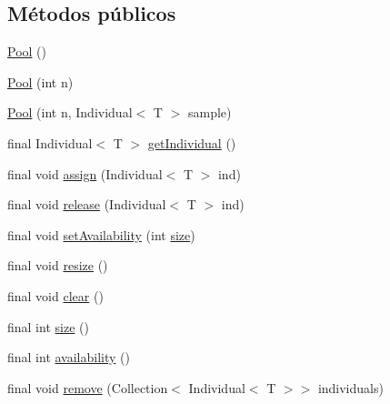\subsection*{Métodos públicos}
\begin{DoxyCompactItemize}
\item 
\hyperlink{classjenes_1_1population_1_1_pool_3_01_t_01extends_01_chromosome_01_4_a4bd84795aaada004e3abac72137269fa}{Pool} ()
\item 
\hyperlink{classjenes_1_1population_1_1_pool_3_01_t_01extends_01_chromosome_01_4_a1f1455e87c094df383563c96e88c4d1b}{Pool} (int n)
\item 
\hyperlink{classjenes_1_1population_1_1_pool_3_01_t_01extends_01_chromosome_01_4_a4326e7c61485eebd85e0ee33ade6ae4a}{Pool} (int n, Individual$<$ T $>$ sample)
\item 
final Individual$<$ T $>$ \hyperlink{classjenes_1_1population_1_1_pool_3_01_t_01extends_01_chromosome_01_4_a56aa9e4c1a8fb6c95c88cbc09f677400}{get\-Individual} ()
\item 
final void \hyperlink{classjenes_1_1population_1_1_pool_3_01_t_01extends_01_chromosome_01_4_aea055f4f71829a56c9d16780d010e861}{assign} (Individual$<$ T $>$ ind)
\item 
final void \hyperlink{classjenes_1_1population_1_1_pool_3_01_t_01extends_01_chromosome_01_4_a5fce371a24676e555aca961e61fb55ae}{release} (Individual$<$ T $>$ ind)
\item 
final void \hyperlink{classjenes_1_1population_1_1_pool_3_01_t_01extends_01_chromosome_01_4_a625297bb7b48e3b6ab11c081874580bf}{set\-Availability} (int \hyperlink{classjenes_1_1population_1_1_pool_3_01_t_01extends_01_chromosome_01_4_a71999d0d1f42f4448c7615cd43bea2f8}{size})
\item 
final void \hyperlink{classjenes_1_1population_1_1_pool_3_01_t_01extends_01_chromosome_01_4_ac9cfd19d4ef83db5f3b1e805458714c2}{resize} ()
\item 
final void \hyperlink{classjenes_1_1population_1_1_pool_3_01_t_01extends_01_chromosome_01_4_a05198e410de8e3d8d12f5598daf079bd}{clear} ()
\item 
final int \hyperlink{classjenes_1_1population_1_1_pool_3_01_t_01extends_01_chromosome_01_4_a71999d0d1f42f4448c7615cd43bea2f8}{size} ()
\item 
final int \hyperlink{classjenes_1_1population_1_1_pool_3_01_t_01extends_01_chromosome_01_4_a8e4a835cda9803129b44c952459ed7da}{availability} ()
\item 
final void \hyperlink{classjenes_1_1population_1_1_pool_3_01_t_01extends_01_chromosome_01_4_afcaf4da5e38def2dfcc15f7fb26103a0}{remove} (Collection$<$ Individual$<$ T $>$$>$ individuals)
$$
\end{DoxyCompactItemize}
